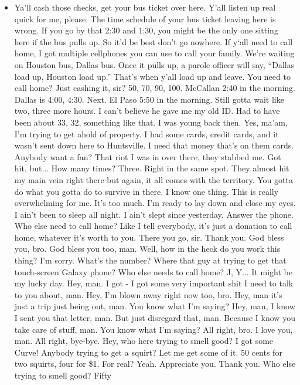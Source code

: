 \begin{itemize}
\tightlist
\item
  Ya'll cash those checks, get your bus ticket over here. Y'all listen
  up real quick for me, please. The time schedule of your bus ticket
  leaving here is wrong. If you go by that 2:30 and 1:30, you might be
  the only one sitting here if the bus pulls up. So it'd be best don't
  go nowhere. If y`all need to call home, I got multiple cellphones you
  can use to call your family. We're waiting on Houston bus, Dallas bus.
  Once it pulls up, a parole officer will say, ``Dallas load up, Houston
  load up.'' That's when y'all load up and leave. You need to call home?
  Just cashing it, sir? 50, 70, 90, 100. McCallan 2:40 in the morning.
  Dallas is 4:00, 4:30. Next. El Paso 5:50 in the morning. Still gotta
  wait like two, three more hours. I can't believe he gave me my old ID.
  Had to have been about 33, 32, something like that. I was young back
  then. Yes, ma'am, I'm trying to get ahold of property. I had some
  cards, credit cards, and it wasn't sent down here to Huntsville. I
  need that money that's on them cards. Anybody want a fan? That riot I
  was in over there, they stabbed me. Got hit, but... How many times?
  Three. Right in the same spot. They almost hit my main vein right
  there but again, it all comes with the territory. You gotta do what
  you gotta do to survive in there. I know one thing. This is really
  overwhelming for me. It's too much. I'm ready to lay down and close my
  eyes. I ain't been to sleep all night. I ain't slept since yesterday.
  Answer the phone. Who else need to call home? Like I tell everybody,
  it's just a donation to call home, whatever it's worth to you. There
  you go, sir. Thank you. God bless you, bro. God bless you too, man.
  Well, how in the heck do you work this thing? I'm sorry. What's the
  number? Where that guy at trying to get that touch-screen Galaxy
  phone? Who else needs to call home? J, Y... It might be my lucky day.
  Hey, man. I got - I got some very important shit I need to talk to you
  about, man. Hey, I'm blown away right now too, bro. Hey, man it's just
  a trip just being out, man. You know what I'm saying? Hey, man, I know
  I sent you that letter, man. But just disregard that, man. Because I
  know you take care of stuff, man. You know what I'm saying? All right,
  bro. I love you, man. All right, bye-bye. Hey, who here trying to
  smell good? I got some Curve! Anybody trying to get a squirt? Let me
  get some of it. 50 cents for two squirts, four for \$1. For real?
  Yeah. Appreciate you. Thank you. Who else trying to smell good? Fifty

\end{itemize}
